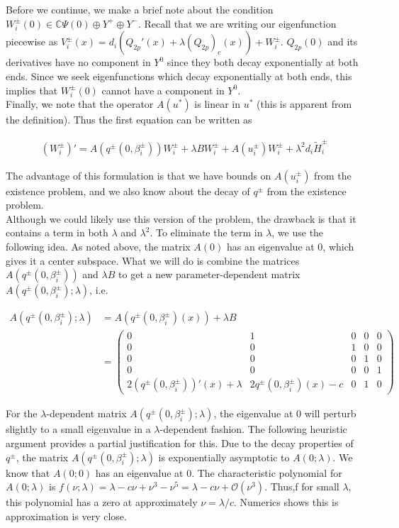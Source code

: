 \documentclass[12pt]{article}
\def\C{{\mathbb C}}
\begin{document}
Before we continue, we make a brief note about the condition $W_i^\pm(0) \in \C \Psi(0) \oplus Y^+ \oplus Y^-$. Recall that we are writing our eigenfunction piecewise as $V_i^\pm(x) = d_i(Q_{2p}'(x) + \lambda (Q_{2p})_c(x)) + W_i^\pm $. $Q_{2p}(0)$ and its derivatives have no component in $Y^0$ since they both decay exponentially at both ends. Since we seek eigenfunctions which decay exponentially at both ends, this implies that $W_i^\pm(0)$ cannot have a component in $Y^0$.\\

Finally, we note that the operator $A(u^*)$ is linear in $u^*$ (this is apparent from the definition). Thus the first equation can be written as 

\begin{align*}
(W_i^\pm)' = A(q^\pm(0, \beta_i^\pm)) W_i^\pm + \lambda B W_i^\pm + A(u_i^\pm) W_i^\pm + \lambda^2 d_i \tilde{H}_i^\pm
\end{align*}

The advantage of this formulation is that we have bounds on $A(u_i^\pm)$ from the existence problem, and we also know about the decay of $q^\pm$ from the existence problem.\\

Although we could likely use this version of the problem, the drawback is that it contains a term in both $\lambda$ and $\lambda^2$. To eliminate the term in $\lambda$, we use the following idea. As noted above, the matrix $A(0)$ has an eigenvalue at 0, which gives it a center subspace. What we will do is combine the matrices $A(q^\pm(0, \beta_i^\pm))$ and $\lambda B$ to get a new parameter-dependent matrix $A(q^\pm(0, \beta_i^\pm); \lambda)$, i.e. 

\begin{align*}
A(q^\pm(0, \beta_i^\pm); \lambda) &= A(q^\pm(0, \beta_i^\pm)(x)) + \lambda B \\
&= \begin{pmatrix}0 & 1 & 0 & 0 & 0 \\0 & 0 & 1 & 0 & 0 \\0 & 0 & 0 & 1 & 0 \\0 & 0 & 0 & 0 & 1 \\
2 (q^\pm(0, \beta_i^\pm))'(x) + \lambda & 2 q^\pm(0, \beta_i^\pm)(x) - c & 0 & 1 & 0 \end{pmatrix}
\end{align*}

For the $\lambda$-dependent matrix $A(q^\pm(0, \beta_i^\pm); \lambda)$, the eigenvalue at 0 will perturb slightly to a small eigenvalue in a $\lambda$-dependent fashion. The following heuristic argument provides a partial justification for this. Due to the decay properties of $q^\pm$, the matrix $A(q^\pm(0, \beta_i^\pm); \lambda)$ is exponentially asymptotic to $A(0; \lambda)$. We know that $A(0; 0)$ has an eigenvalue at 0. The characteristic polynomial for $A(0; \lambda)$ is $f(\nu; \lambda) = \lambda - c \nu + \nu^3 - \nu^5 = \lambda - c \nu + \mathcal{O}(\nu^3)$. Thus,f for small $\lambda$, this polynomial has a zero at approximately $\nu = \lambda / c$. Numerics shows this is approximation is very close.\\
\end{document}
